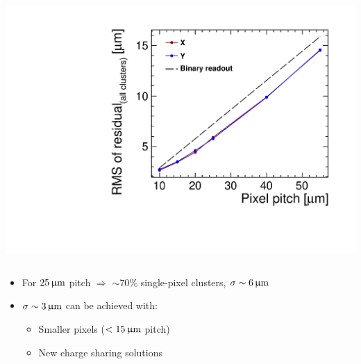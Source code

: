 \begin{frame}
\begin{columns}
    \centering
    \includegraphics[width=\textwidth]{../figures/TestBeam/RMS_extrapolationSmallerPixels.pdf}
  \end{columns}

  \begin{itemize}
  \item For $25\,\upmu\mathrm{m}$ pitch $\Rightarrow$ $\sim70\%$ single-pixel
    clusters, $\sigma\sim6\,\upmu\mathrm{m}$
  \item $\sigma\sim3\,\upmu\mathrm{m}$ can be achieved with:
    \begin{itemize} 
    \item Smaller pixels
      ($<15\,\upmu\mathrm{m}$ pitch)
    \item New charge sharing solutions
    \end{itemize}
  \end{itemize}

\end{frame}

